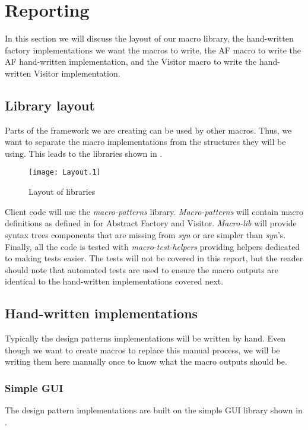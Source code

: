 \section{Reporting}
In this section we will discuss the layout of our macro library, the hand-written factory implementations we want the macros to write, the AF macro to write the AF hand-written implementation, and the Visitor macro to write the hand-written Visitor implementation.

\subsection{Library layout}
Parts of the framework we are creating can be used by other macros.
Thus, we want to separate the macro implementations from the structures they will be using.
This leads to the libraries shown in .

\begin{figure}[h]
	\centering
	\texttt{[image: Layout.1]}
	\caption{Layout of libraries}
	\label{fig:LibraryLayout}
\end{figure}

Client code will use the \textit{macro-patterns} library.
\textit{Macro-patterns} will contain macro definitions as defined in  for Abstract Factory and Visitor.
\textit{Macro-lib} will provide syntax trees components that are missing from \textit{syn} or are simpler than \textit{syn}'s.
Finally, all the code is tested with \textit{macro-test-helpers} providing helpers dedicated to making tests easier.
The tests will not be covered in this report, but the reader should note that automated tests are used to ensure the macro outputs are identical to the hand-written implementations covered next.

\subsection{Hand-written implementations}
\label{sec:hand-written}
Typically the design patterns implementations will be written by hand.
Even though we want to create macros to replace this manual process, we will be writing them here manually once to know what the macro outputs should be.

\subsubsection{Simple GUI}
The design pattern implementations are built on the simple GUI library shown in .

